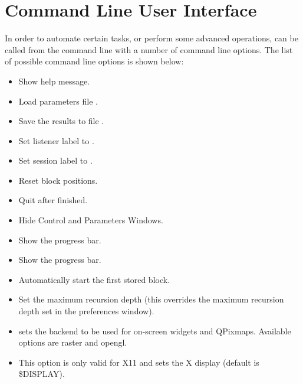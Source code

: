 \documentclass[a4paper,12pt,english]{sphinxmanual}
\begin{document}
\chapter{Command Line User Interface}
\label{commandline_user_interface:sec-cmd-user-interface}\label{commandline_user_interface::doc}\label{commandline_user_interface:command-line-user-interface}
In order to automate certain tasks, or perform some advanced operations,
 can be called from the command line with a number of
command line options. The list of possible command line options is shown below:
\begin{itemize}
\item {} 
 Show help message.

\item {} 
 Load parameters file .

\item {} 
 Save the results to file .

\item {} 
 Set listener label to .

\item {} 
 Set session label to .

\item {} 
 Reset block positions.

\item {} 
 Quit after finished.

\item {} 
 Hide Control and Parameters Windows.

\item {} 
 Show the progress bar.

\item {} 
 Show the progress bar.

\item {} 
 Automatically start the first stored block.

\item {} 
 Set the maximum recursion depth (this
overrides the maximum recursion depth set in the preferences window).

\item {} 
 sets the backend to be used for on-screen
widgets and QPixmaps. Available options are raster and opengl.

\item {} 
 This option is only valid for X11 and sets the X
display (default is \$DISPLAY).

\end{itemize}
\end{document}
